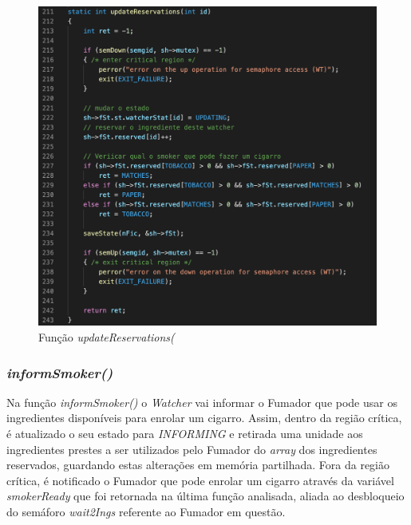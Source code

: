 \documentclass[10pt,portuguese]{article}
\begin{document}
\begin{figure}[!h]
    \centering
    \includegraphics[width=\textwidth]{images/implementation/updateres.png}
    \caption{Função \textit{updateReservations(}}
\end{figure}

\clearpage

\subsubsection{\textit{informSmoker()}}

\par Na função \textit{informSmoker()} o \textit{Watcher} vai informar o Fumador que pode usar os ingredientes disponíveis para enrolar um cigarro. Assim, dentro da região crítica, é atualizado o seu estado para \textit{INFORMING} e retirada uma unidade aos ingredientes prestes a ser utilizados pelo Fumador do \textit{array} dos ingredientes reservados, guardando estas alterações em memória partilhada. Fora da região crítica, é notificado o Fumador que pode enrolar um cigarro através da variável \textit{smokerReady} que foi retornada na última função analisada, aliada ao desbloqueio do semáforo \textit{wait2Ings} referente ao Fumador em questão.
\end{document}
